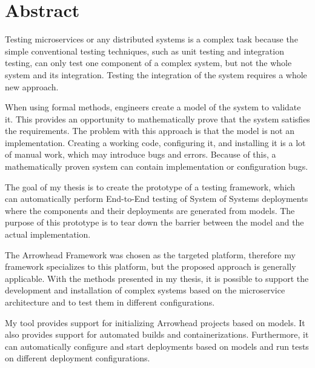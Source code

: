 \vfill
\selectenglish


\chapter*{Abstract}

Testing microservices or any distributed systems is a complex task because the simple conventional testing techniques, such as unit testing and integration testing, can only test one component of a complex system, but not the whole system and its integration. Testing the integration of the system requires a whole new approach.

When using formal methods, engineers create a model of the system to validate it. This provides an opportunity to mathematically prove that the system satisfies the requirements. The problem with this approach is that the model is not an implementation. Creating a working code, configuring it, and installing it is a lot of manual work, which may introduce bugs and errors. Because of this, a mathematically proven system can contain implementation or configuration bugs.

The goal of my thesis is to create the prototype of a testing framework, which can automatically perform End-to-End testing of System of Systems deployments where the components and their deployments are generated from models. The purpose of this prototype is to tear down the barrier between the model and the actual implementation.

The Arrowhead Framework was chosen as the targeted platform, therefore my framework specializes to this platform, but the proposed approach is generally applicable. With the methods presented in my thesis, it is possible to support the development and installation of complex systems based on the microservice architecture and to test them in different configurations. 

My tool provides support for initializing Arrowhead projects based on models. It also provides support for automated builds and containerizations. Furthermore, it can automatically configure and start deployments based on models and run tests on different deployment configurations.

\vfill
\cleardoublepage

\selectthesislanguage

\setcounter{romanPage}{\value{page}}
